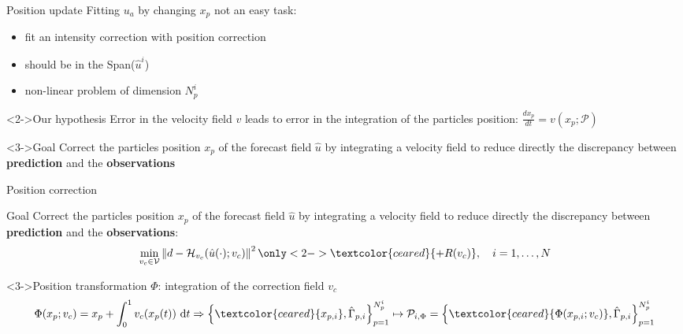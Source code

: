 \documentclass[aspectratio=169]{beamer} %
\begin{document}
\begin{frame}{Position update}
    Fitting $u_a$ by changing $x_p$ not an easy task:
    \begin{itemize}
        \item fit an intensity correction with position correction
        \item should be in the Span($\hat u^i$)
        \item non-linear problem of dimension $N_p^i$
    \end{itemize}

    \begin{block}<2->{Our hypothesis}
        Error in the velocity field $v$ leads to error in the integration of the particles position: $\frac{d x_p}{d t} = v(x_p; \mathcal P)$
    \end{block}

    \begin{block}<3->{Goal}
        Correct the particles position $x_p$ of the forecast field $\hat u$ by integrating a velocity field to reduce directly the discrepancy between \textbf{prediction} and the \textbf{observations}
    \end{block}
\end{frame}

\begin{frame}{Position correction}
    \begin{block}{Goal}
        Correct the particles position $x_p$ of the forecast field $\hat u$ by integrating a velocity field to reduce directly the discrepancy between \textbf{prediction} and the \textbf{observations}:
        \begin{equation*}
            \min_{v_c \in \mathcal V} \left\|d - \mathcal H_{v_c}(\hat u(\cdot); v_c) \right\|^2 \only<2->{\textcolor{ceared}{+ R(v_c)}}, \quad i = 1, \dots, N
        \end{equation*}
    \end{block}

    \begin{block}<3->{Position transformation $\Phi$: integration of the correction field $v_c$}
        \begin{equation*}
            \Phi(x_p; v_c) = x_p + \int_{0}^{1} v_c(x_p(t))~\mathrm{d}t \Rightarrow \left\{\textcolor{ceared}{x_{p,i}}, \hat \Gamma_{p,i}\right\}_{p=1}^{N^i_p} \mapsto \mathcal{P}_{i, \Phi} = \left\{\textcolor{ceared}{\Phi(x_{p,i}; v_c)}, \hat \Gamma_{p,i}\right\}_{p=1}^{N^i_p}
        \end{equation*}
    \end{block}
\end{frame}
\end{document}
